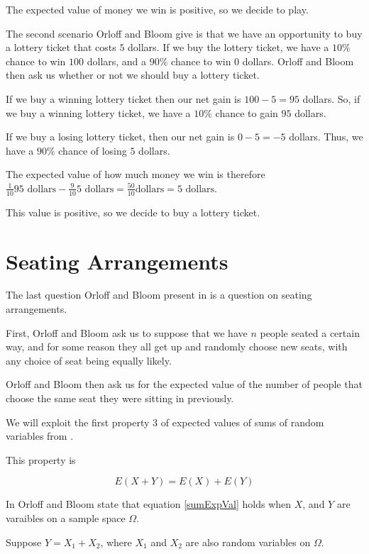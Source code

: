 \documentclass[a4paper,11pt]{article}
\begin{document}
The expected value of money we win is positive, so we decide to play.

The second scenario Orloff and Bloom give is that we have an 
opportunity to buy a lottery ticket that costs $5$ dollars.  If we
buy the lottery ticket, we have a $10\%$ chance to win $100$ dollars,
and a $90\%$ chance to win $0$ dollars.  Orloff and Bloom then ask us
whether or not we should buy a lottery ticket.

If we buy a winning lottery ticket then our net gain is $100 - 5 = 95$
dollars.  So, if we buy a winning lottery ticket, we have a $10\%$ chance
to gain $95$ dollars.

If we buy a losing lottery ticket, then our net gain is $0 - 5 = -5$
dollars.  Thus, we have a $90\%$ chance of losing $5$ dollars.

The expected value of how much money we win is therefore $\frac{1}{10} 
95 \text{ dollars} - \frac{9}{10} 5 \text{ dollars}  = 
\frac{50}{10} \text{dollars} = 5 \text{ dollars}$.

This value is positive, so we decide to buy a lottery ticket.

\section{Seating Arrangements}

The last question Orloff and Bloom present in \cite{slides4} is a
question on seating arrangements.

First, Orloff and Bloom ask us to suppose that we have $n$ people 
seated a certain way, and for some reason they all get up and randomly
choose new seats, with any choice of seat being equally likely.

Orloff and Bloom then ask us for the expected value of the number of
people that choose the same seat they were sitting in previously.

We will exploit the first property 3 of expected values of sums of 
random variables from \cite{reading4b}.

This property is 

\begin{equation} \label{sumExpVal}
  E \left( X + Y \right) = E \left( X \right) + E \left( Y \right)
\end{equation}

In \cite{reading4b} Orloff and Bloom state that equation 
\ref{sumExpVal} holds when $X$, and $Y$ are varaibles on a sample
space $\Omega$.

Suppose $Y = X_{1} +X_{2}$, where $X_{1}$ and $X_{2}$ are also random
variables on $\Omega$.
\end{document}
